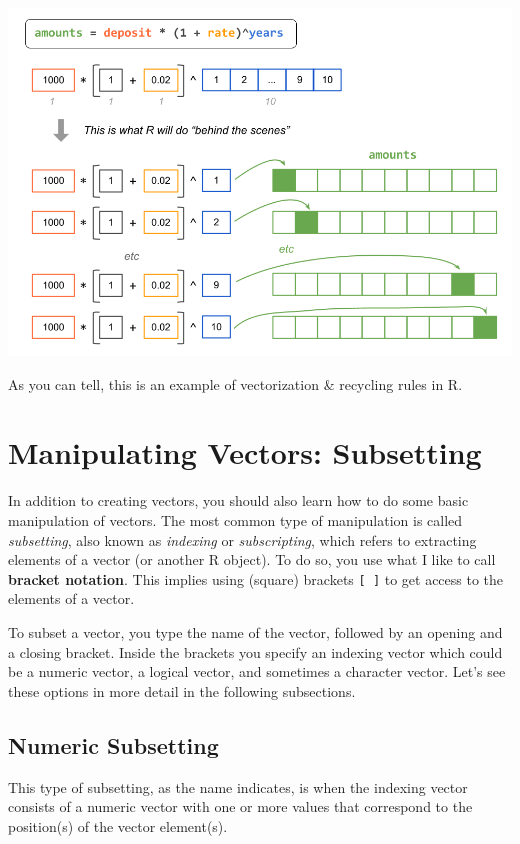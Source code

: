 \documentclass[
]{book}
\begin{document}
\begin{center}\includegraphics[width=0.9\linewidth]{images/vectors/vectorized2} \end{center}

As you can tell, this is an example of vectorization \& recycling rules in R.

\hypertarget{manipulating-vectors-subsetting}{%
\section{Manipulating Vectors: Subsetting}\label{manipulating-vectors-subsetting}}

In addition to creating vectors, you should also learn how to do some basic
manipulation of vectors. The most common type of manipulation is called
\emph{subsetting}, also known as \emph{indexing} or \emph{subscripting}, which refers to
extracting elements of a vector (or another R object). To do so, you use what
I like to call \textbf{bracket notation}. This implies using (square) brackets \texttt{{[}\ {]}}
to get access to the elements of a vector.

To subset a vector, you type the name of the vector, followed by an opening
and a closing bracket. Inside the brackets you specify an indexing vector
which could be a numeric vector, a logical vector, and sometimes a character
vector. Let's see these options in more detail in the following subsections.

\hypertarget{numeric-subsetting}{%
\subsection{Numeric Subsetting}\label{numeric-subsetting}}

This type of subsetting, as the name indicates, is when the indexing vector
consists of a numeric vector with one or more values that correspond to the
position(s) of the vector element(s).
\end{document}
